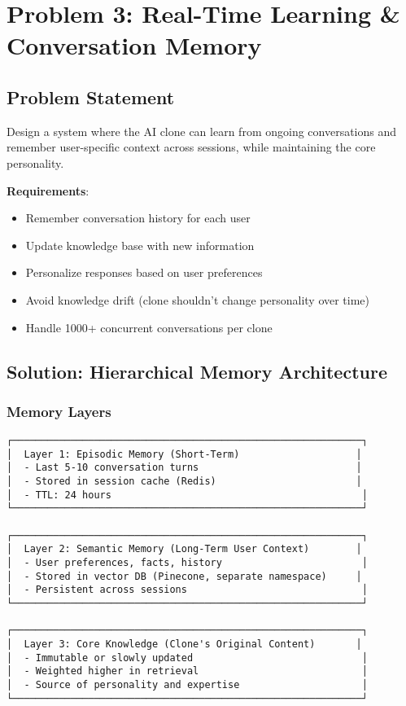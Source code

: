 \documentclass[10pt]{article}
\begin{document}
\section{Problem 3: Real-Time Learning \& Conversation Memory}

\subsection{Problem Statement}

Design a system where the AI clone can learn from ongoing conversations and remember user-specific context across sessions, while maintaining the core personality.

\textbf{Requirements}:
\begin{itemize}[leftmargin=*]
    \item Remember conversation history for each user
    \item Update knowledge base with new information
    \item Personalize responses based on user preferences
    \item Avoid knowledge drift (clone shouldn't change personality over time)
    \item Handle 1000+ concurrent conversations per clone
\end{itemize}

\subsection{Solution: Hierarchical Memory Architecture}

\subsubsection{Memory Layers}

\begin{verbatim}
┌────────────────────────────────────────────────────────────┐
│  Layer 1: Episodic Memory (Short-Term)                    │
│  - Last 5-10 conversation turns                           │
│  - Stored in session cache (Redis)                        │
│  - TTL: 24 hours                                           │
└────────────────────────────────────────────────────────────┘

┌────────────────────────────────────────────────────────────┐
│  Layer 2: Semantic Memory (Long-Term User Context)        │
│  - User preferences, facts, history                        │
│  - Stored in vector DB (Pinecone, separate namespace)     │
│  - Persistent across sessions                              │
└────────────────────────────────────────────────────────────┘

┌────────────────────────────────────────────────────────────┐
│  Layer 3: Core Knowledge (Clone's Original Content)       │
│  - Immutable or slowly updated                             │
│  - Weighted higher in retrieval                            │
│  - Source of personality and expertise                     │
└────────────────────────────────────────────────────────────┘
\end{verbatim}
\end{document}
